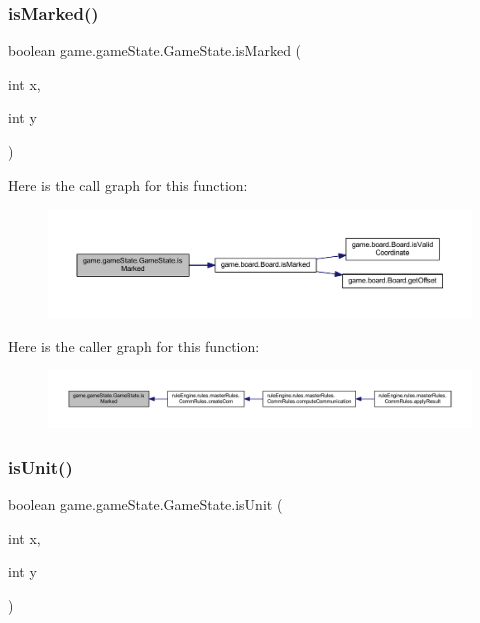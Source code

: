 \subsubsection{\texorpdfstring{is\+Marked()}{isMarked()}}
{\footnotesize\ttfamily boolean game.\+game\+State.\+Game\+State.\+is\+Marked (\begin{DoxyParamCaption}\item[{int}]{x,  }\item[{int}]{y }\end{DoxyParamCaption})\hspace{0.3cm}{\ttfamily [inline]}}

Here is the call graph for this function\+:
\nopagebreak
\begin{figure}[H]
\begin{center}
\leavevmode
\includegraphics[width=350pt]{classgame_1_1game_state_1_1_game_state_abfb97afaa4914330a9df6db34e0ae323_cgraph}
\end{center}
\end{figure}
Here is the caller graph for this function\+:
\nopagebreak
\begin{figure}[H]
\begin{center}
\leavevmode
\includegraphics[width=350pt]{classgame_1_1game_state_1_1_game_state_abfb97afaa4914330a9df6db34e0ae323_icgraph}
\end{center}
\end{figure}
\mbox{\label{classgame_1_1game_state_1_1_game_state_aa00899823d9599e053902598707f2bae}} 
\subsubsection{\texorpdfstring{is\+Unit()}{isUnit()}}
{\footnotesize\ttfamily boolean game.\+game\+State.\+Game\+State.\+is\+Unit (\begin{DoxyParamCaption}\item[{int}]{x,  }\item[{int}]{y }\end{DoxyParamCaption})\hspace{0.3cm}{\ttfamily [inline]}}

